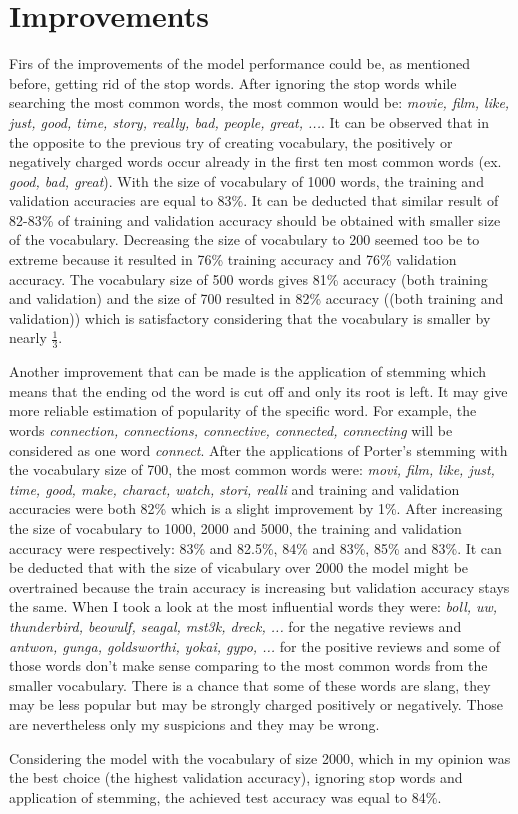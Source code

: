 \documentclass{article}
\begin{document}
\section{Improvements}
\label{improv}
Firs of the improvements of the model performance could be, as mentioned before, getting rid of the stop words. After ignoring the stop words while searching the most common words, the most common would be: \textit{movie, film, like, just, good, time, story, really, bad, people, great, ...}. It can be observed that in the opposite to the previous try of creating vocabulary, the positively or negatively charged words occur already in the first ten most common words (ex. \textit{good, bad, great}). With the size of vocabulary of 1000 words, the training and validation accuracies are equal to 83\%. It can be deducted that similar result of 82-83\% of training and validation accuracy should be obtained with smaller size of the vocabulary. Decreasing the size of vocabulary to 200 seemed too be to extreme because it resulted in 76\% training accuracy and 76\% validation accuracy. The vocabulary size of 500 words gives 81\% accuracy (both training and validation) and the size of 700 resulted in 82\% accuracy ((both training and validation)) which is satisfactory considering that the vocabulary is smaller by nearly $\frac{1}{3}$.

Another improvement that can be made is the application of stemming which means that the ending od the word is cut off and only its root is left. It may give more reliable estimation of popularity of the specific word. For example, the words \textit{connection, connections, connective, connected, connecting} will be considered as one word \textit{connect}. After the applications of Porter's stemming with the vocabulary size of 700, the most common words were: \textit{movi, film, like, just, time, good, make, charact, watch, stori, realli} and training and validation accuracies were both 82\% which is a slight improvement by 1\%. After increasing the size of vocabulary to 1000, 2000 and 5000, the training and validation accuracy were respectively: 83\% and 82.5\%, 84\% and 83\%, 85\% and 83\%. It can be deducted that with the size of vicabulary over 2000 the model might be overtrained because the train accuracy is increasing but validation accuracy stays the same. When I took a look at the most influential words they were: \textit{boll, uw, thunderbird, beowulf, seagal, mst3k, dreck, ...} for the negative reviews and \textit{antwon, gunga, goldsworthi, yokai, gypo, ...} for the positive reviews and some of those words don't make sense comparing to the most common words from the smaller vocabulary. There is a chance that some of these words are slang, they may be less popular but may be strongly charged positively or negatively. Those are nevertheless only my suspicions and they may be wrong.

Considering the model with the vocabulary of size 2000, which in my opinion was the best choice (the highest validation accuracy), ignoring stop words and application of stemming, the achieved test accuracy was equal to 84\%.
\end{document}
